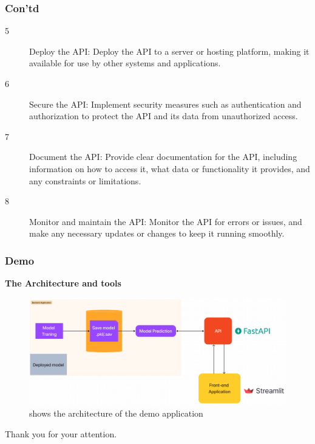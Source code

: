 \documentclass[aspectratio=169]{beamer}
\begin{document}
\begin{frame}
    \frametitle{Con'td}
    \begin{description}
        \item[5] Deploy the API: Deploy the API to a server or hosting platform, making it available for use by other systems and applications.
        \item[6] Secure the API: Implement security measures such as authentication and authorization to protect the API and its data from unauthorized access.
        \item[7] Document the API: Provide clear documentation for the API, including information on how to access it, what data or functionality it provides, and any constraints or limitations.
        \item[8] Monitor and maintain the API: Monitor the API for errors or issues, and make any necessary updates or changes to keep it running smoothly.
    \end{description}
\end{frame}

\begin{frame}
    \frametitle{Demo}
    \textbf{The Architecture and tools}
    \begin{figure}
        \centering
        \includegraphics[scale=0.25]{./images/architecture.png}
        \caption{shows the architecture of the demo application}
        \label{figure:architecture}
    \end{figure}
\end{frame}

\begin{frame}
    \centering
    Thank you for your attention.
\end{frame}
\end{document}
